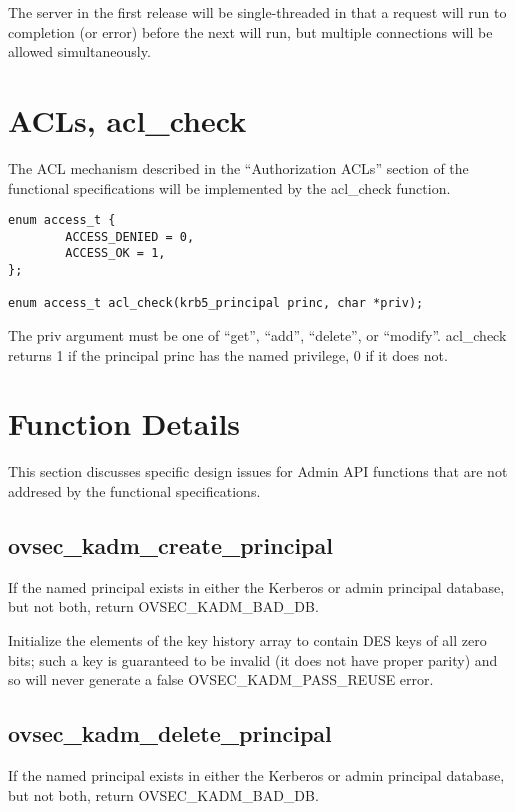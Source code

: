 The server in the first release will be single-threaded in that a
request will run to completion (or error) before the next will run,
but multiple connections will be allowed simultaneously.

\section{ACLs, acl_check}

The ACL mechanism described in the ``Authorization ACLs'' section of
the functional specifications will be implemented by the acl_check
function.

\begin{verbatim}
enum access_t {
        ACCESS_DENIED = 0,
        ACCESS_OK = 1,
};

enum access_t acl_check(krb5_principal princ, char *priv);
\end{verbatim}

The priv argument must be one of ``get'', ``add'', ``delete'', or
``modify''.  acl_check returns 1 if the principal princ has the named
privilege, 0 if it does not.

\section{Function Details}

This section discusses specific design issues for Admin API functions
that are not addresed by the functional specifications.

\subsection{ovsec_kadm_create_principal}

If the named principal exists in either the Kerberos or admin
principal database, but not both, return OVSEC_KADM_BAD_DB.

Initialize the elements of the key history array to contain DES keys
of all zero bits; such a key is guaranteed to be invalid (it does not
have proper parity) and so will never generate a false
OVSEC_KADM_PASS_REUSE error.

\subsection{ovsec_kadm_delete_principal}

If the named principal exists in either the Kerberos or admin
principal database, but not both, return OVSEC_KADM_BAD_DB.


